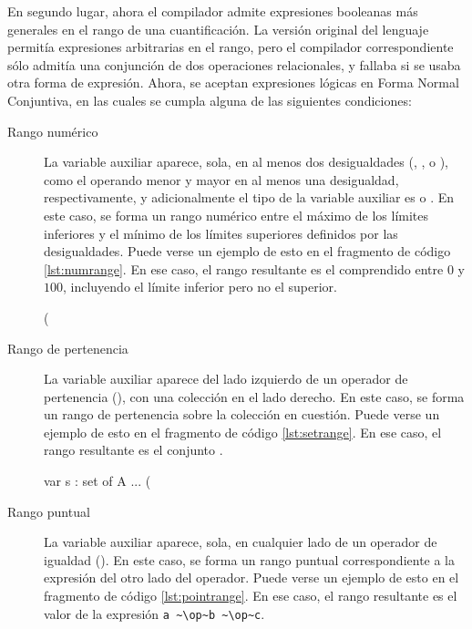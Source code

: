 En segundo lugar, ahora el compilador admite expresiones booleanas más generales
en el rango de una cuantificación. La versión original del lenguaje permitía
expresiones arbitrarias en el rango, pero el compilador correspondiente sólo
admitía una conjunción de dos operaciones relacionales, y fallaba si se usaba
otra forma de expresión. Ahora, se aceptan expresiones lógicas en Forma Normal
Conjuntiva, en las cuales se cumpla alguna de las siguientes condiciones:

\begin{description}%

  \item [Rango numérico] La variable auxiliar aparece, sola, en al menos dos
  desigualdades (\ingra{<}, \ingra{<=}, \ingra{>} o \ingra{>=}), como el
  operando menor y mayor en al menos una desigualdad, respectivamente, y
  adicionalmente el tipo de la variable auxiliar es  o .
  En este caso, se forma un rango numérico entre el máximo de los límites
  inferiores y el mínimo de los límites superiores definidos por las
  desigualdades. Puede verse un ejemplo de esto en el fragmento de código
  \ref{lst:numrange}. En ese caso, el rango resultante es el comprendido entre $0$ y $100$,
  incluyendo  el límite inferior pero no el superior.

\begin{gracielacode}[caption=Cuantificación con rango numérico, label=lst:numrange]
(%
\end{gracielacode}

  \item [Rango de pertenencia] La variable auxiliar aparece del lado izquierdo
  de un operador de pertenencia (\Elem), con una colección en el lado derecho.
  En este caso, se forma un rango de pertenencia sobre la colección en
  cuestión. Puede verse un ejemplo de esto en el fragmento de código
  \ref{lst:setrange}.  En ese caso, el rango resultante es el conjunto .

\begin{gracielacode}[caption=Cuantificación con rango de pertenencia, label=lst:setrange]
var s : set of A
...
(%
\end{gracielacode}

  \item [Rango puntual] La variable auxiliar aparece, sola, en cualquier lado de
  un operador de igualdad (\ingra{==}). En este caso, se forma un rango puntual
  correspondiente a la expresión del otro lado del operador. Puede verse un
  ejemplo de esto en el fragmento de código \ref{lst:pointrange}. En ese caso,
  el rango resultante es el valor de la expresión
  \lstinline[language=graciela]{a ~\op~b ~\op~c}.


\end{description}
